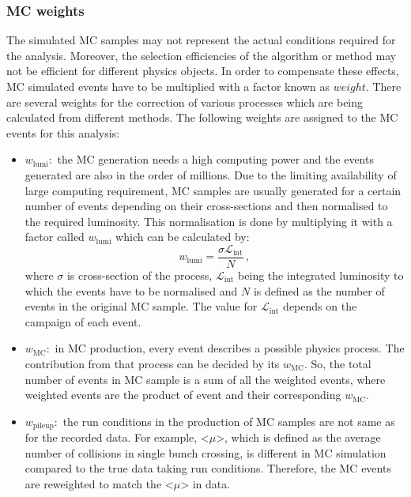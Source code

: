 \subsubsection{MC weights}%
\label{sec:analysisstrategy:mc:weights}
The simulated MC samples may not represent the actual conditions required for the analysis. Moreover, the selection efficiencies of the algorithm or method may not be efficient for different physics objects. In order to compensate these effects, MC simulated events have to be multiplied with a factor known as $weight$. There are several weights for the correction of various processes which are being calculated from different methods. The following weights are assigned to the MC events for this analysis:
\begin{itemize}
	\item $w_{\text{lumi}}:$ the MC generation needs a high computing power and the events generated are also in the order of millions. Due to the limiting availability of large computing requirement, MC samples are usually generated for a certain number of events depending on their cross-sections and then normalised to the required luminosity. This normalisation is done by multiplying it with a factor called $w_{\text{lumi}}$ which can be calculated by: \[w_{\text{lumi}} = \frac{\sigma\mathcal{L}_{\text{int}}}{N} \,,\]
	where $\sigma$ is cross-section of the process, $\mathcal{L}_{\text{int}}$ being the integrated luminosity to which the events have to be normalised and $N$ is defined as the number of events in the original MC sample. The value for $\mathcal{L}_{\text{int}}$ depends on the campaign of each event.
	
	\item $w_{\text{MC}}:$ in MC production, every event describes a possible physics process. The contribution from that process can be decided by its $w_{\text{MC}}$. So, the total number of events in MC sample is a sum of all the weighted events, where weighted events are the product of event and their corresponding $w_{\text{MC}}$. 
	
	\item $w_{\text{pileup}}:$ the run conditions in the production of MC samples are not same as for the recorded data. For example, <$\mu$>, which is defined as the average number of collisions in single bunch crossing, is different in MC simulation compared to the true data taking run conditions. Therefore, the MC events are reweighted to match the <$\mu$> in data.
	

\end{itemize}
